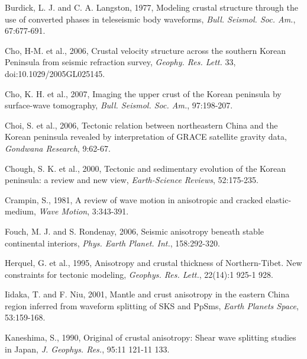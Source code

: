 \documentclass{article}
\begin{document}
\begin{thebibliography}{99}
\item Burdick, L. J. and C. A. Langston, 1977, Modeling crustal structure through the use of converted phases in teleseismic body waveforms, \textit{Bull. Seismol. Soc. Am.}, 67:677-691.

\item Cho, H-M. et al., 2006, Crustal velocity structure across the southern Korean Peninsula from seismic refraction survey, \textit{Geophy. Res. Lett.} 33, doi:10.1029/2005GL025145.

\item Cho, K. H. et al., 2007, Imaging the upper crust of the Korean peninsula by surface-wave tomography, \textit{Bull. Seismol. Soc. Am.}, 97:198-207.

\item Choi, S. et al., 2006, Tectonic relation between northeastern China and the Korean peninsula revealed by interpretation of GRACE satellite gravity data, \textit{Gondwana Research}, 9:62-67.

\item Chough, S. K. et al., 2000, Tectonic and sedimentary evolution of the Korean peninsula: a review and new view, \textit{Earth-Science Reviews}, 52:175-235.

\item Crampin, S., 1981, A review of wave motion in anisotropic and cracked elastic-medium, \textit{Wave Motion}, 3:343-391.

\item Fouch, M. J. and S. Rondenay, 2006, Seismic anisotropy beneath stable continental interiors, \textit{Phys. Earth Planet. Int.}, 158:292-320.

\item Herquel, G. et al., 1995, Anisotropy and crustal thickness of Northern-Tibet. New constraints for tectonic modeling, \textit{Geophys. Res. Lett.}, 22(14):1 925-1 928.

\item Iidaka, T. and F. Niu, 2001, Mantle and crust anisotropy in the eastern China region inferred from waveform splitting of SKS and PpSms, \textit{Earth Planets Space}, 53:159-168.

\item Kaneshima, S., 1990, Original of crustal anisotropy: Shear wave splitting studies in Japan, \textit{J. Geophys. Res.}, 95:11 121-11 133.


\end{thebibliography}
\end{document}
